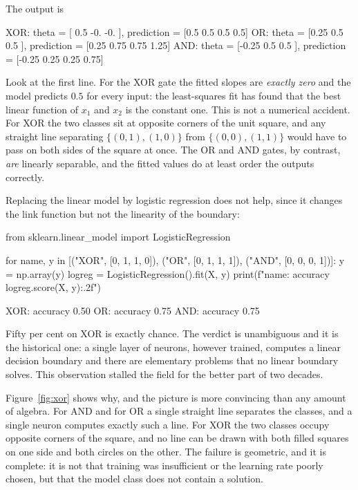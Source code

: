 The output is
\begin{Python}{}
XOR: theta = [ 0.5 -0.  -0. ], prediction = [0.5 0.5 0.5 0.5]
OR:  theta = [0.25 0.5  0.5 ], prediction = [0.25 0.75 0.75 1.25]
AND: theta = [-0.25 0.5  0.5 ], prediction = [-0.25 0.25 0.25 0.75]
\end{Python}

Look at the first line.  For the XOR gate the fitted slopes are \emph{exactly
zero} and the model predicts $0.5$ for every input: the least-squares fit has
found that the best linear function of $x_1$ and $x_2$ is the constant one.
This is not a numerical accident.  For XOR the two classes sit at opposite
corners of the unit square, and any straight line separating $\{(0,1),(1,0)\}$
from $\{(0,0),(1,1)\}$ would have to pass on both sides of the square at once.
The OR and AND gates, by contrast, \emph{are} linearly separable, and the fitted
values do at least order the outputs correctly.

Replacing the linear model by logistic regression does not help, since it
changes the link function but not the linearity of the boundary:

\begin{Python}{}
from sklearn.linear_model import LogisticRegression

for name, y in [("XOR", [0, 1, 1, 0]), ("OR", [0, 1, 1, 1]), ("AND", [0, 0, 0, 1])]:
    y = np.array(y)
    logreg = LogisticRegression().fit(X, y)
    print(f"{name}: accuracy {logreg.score(X, y):.2f}")
\end{Python}

\begin{Python}{}
XOR: accuracy 0.50
OR:  accuracy 0.75
AND: accuracy 0.75
\end{Python}

Fifty per cent on XOR is exactly chance.  The verdict is unambiguous and it is
the historical one: a single layer of neurons, however trained, computes a
linear decision boundary and there are elementary problems that no linear
boundary solves.  This observation stalled the field for the better part of two
decades.

Figure~\ref{fig:xor} shows why, and the picture is more convincing than any
amount of algebra.  For AND and for OR a single straight line separates the
classes, and a single neuron computes exactly such a line.  For XOR the two
classes occupy opposite corners of the square, and no line can be drawn with
both filled squares on one side and both circles on the other.  The failure is
geometric, and it is complete: it is not that training was insufficient or the
learning rate poorly chosen, but that the model class does not contain a
solution.

